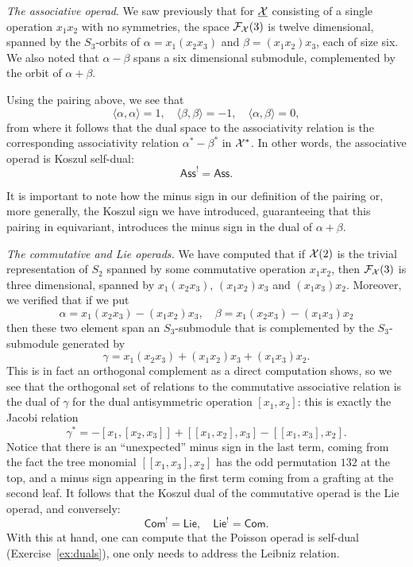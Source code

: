 \bigskip

\emph{The associative operad}. We saw previously that for
$\underline{\mathcal{X}}$ consisting of a single operation
$x_1x_2$ with no symmetries, the
space $\mathcal{F}_{\mathcal{X}}(3)$ is twelve dimensional, spanned by
the $S_3$-orbits of $\alpha = x_1(x_2x_3)$ and $\beta =(x_1x_2)x_3$,
each of size six. We also noted that $\alpha-\beta$
spans a six dimensional submodule, complemented by the
orbit of $\alpha+\beta$. 

Using the pairing above, we see that
\[\langle \alpha,\alpha\rangle = 1,
	\quad \langle\beta,\beta\rangle = -1,
	\quad \langle \alpha,\beta\rangle = 0, \] 
from where it follows that the dual space to the associativity
relation is the corresponding associativity relation
$\alpha^* - \beta^*$ in $\mathcal{X}^*$. In other words,
the associative operad is Koszul self-dual:
\[\mathsf{Ass}^! = \mathsf{Ass}.\]

It is important to note how the minus sign in our
definition of the pairing or, more generally, the
Koszul sign we have introduced, guaranteeing that
this pairing in equivariant, introduces the minus sign
in the dual of $\alpha+\beta$.

\bigskip

\emph{The commutative and Lie operads.}
We have computed that if $\mathcal{X}(2)$ is the trivial representation
of $S_2$ spanned by some commutative operation $x_1x_2$,
then $\mathcal{F}_{\mathcal{X}}(3)$ is three dimensional, spanned by
$x_1(x_2x_3)$, $(x_1x_2)x_3$ and $(x_1x_3)x_2$.
Moreover, we verified that if we put
\[ \alpha = x_1(x_2x_3) -(x_1x_2)x_3, 	\quad 
     \beta =  x_1(x_2x_3) -(x_1x_3)x_2 \]
     then these two element span an $S_3$-submodule
     that is complemented by the $S_3$-submodule generated by
     \[ \gamma = x_1(x_2x_3) +(x_1x_2)x_3+  (x_1x_3)x_2.\]
 This is in fact an orthogonal complement as a direct computation
 shows, so we see that the orthogonal set of relations
 to the commutative associative relation is the dual of
 $\gamma$ for the dual antisymmetric operation $[x_1,x_2]$:
 this is exactly the Jacobi relation
 \[ 
 \gamma^* = -[x_1,[x_2,x_3]] +[[x_1,x_2],x_3]-[[x_1,x_3],x_2].
 \]
 Notice that there is an ``unexpected'' minus
 sign in the last term, coming from the fact
 the tree monomial $[[x_1,x_3],x_2]$
 has the odd permutation $132$
 at the top, and a minus sign appearing in the
 first term coming from a grafting at the second
 leaf.  It follows that the Koszul dual of 
 the commutative operad is the  Lie operad, 
 and conversely:
 \[ \mathsf{Com}^! = \mathsf{Lie}, \quad
  \mathsf{Lie}^! = \mathsf{Com}.
  	\]
With this at hand, one can compute that the Poisson operad 
is self-dual (Exercise~\ref{ex:duals}), one only needs to 
address the Leibniz relation.  


